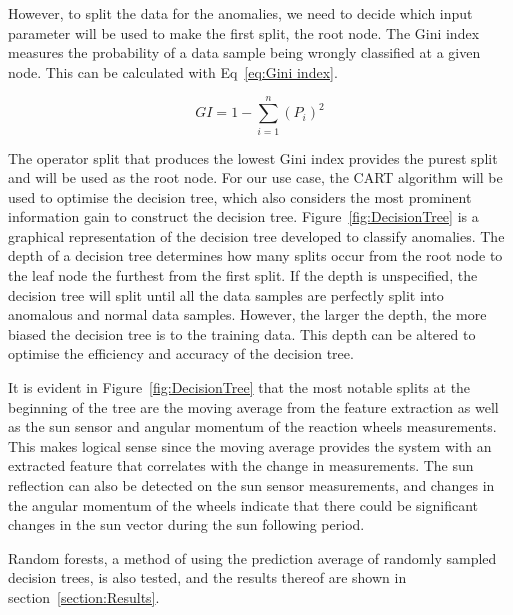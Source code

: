 \documentclass[letterpaper, 10 pt, conference]{ieeeconf}  %
\begin{document}
However, to split the data for the anomalies, we need to decide which input parameter will be used to make the first split, the root node. The Gini index measures the probability of a data sample being wrongly classified at a given node. This can be calculated with Eq~\ref{eq:Gini index}.

\begin{equation}
GI = 1 - \sum_{i = 1}^{n}{(P_i)^2}
\label{eq:Gini index}
\end{equation}

The operator split that produces the lowest Gini index provides the purest split and will be used as the root node. For our use case, the CART algorithm will be used to optimise the decision tree, which also considers the most prominent information gain to construct the decision tree. Figure~\ref{fig:DecisionTree} is a graphical representation of the decision tree developed to classify anomalies. The depth of a decision tree determines how many splits occur from the root node to the leaf node the furthest from the first split. If the depth is unspecified, the decision tree will split until all the data samples are perfectly split into anomalous and normal data samples. However, the larger the depth, the more biased the decision tree is to the training data. This depth can be altered to optimise the efficiency and accuracy of the decision tree.


It is evident in Figure~\ref{fig:DecisionTree} that the most notable splits at the beginning of the tree are the moving average from the feature extraction as well as the sun sensor and angular momentum of the reaction wheels measurements. This makes logical sense since the moving average provides the system with an extracted feature that correlates with the change in measurements. The sun reflection can also be detected on the sun sensor measurements, and changes in the angular momentum of the wheels indicate that there could be significant changes in the sun vector during the sun following period.

Random forests, a method of using the prediction average of randomly sampled decision trees, is also tested, and the results thereof are shown in section~\ref{section:Results}.
\end{document}

